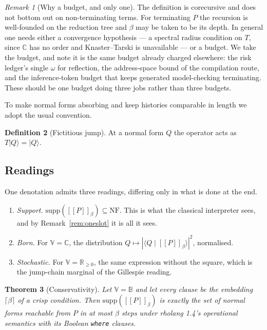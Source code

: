 \documentclass[11pt,a4paper]{article}
\theoremstyle{plain}
\newtheorem{theorem}{Theorem}[section]
\theoremstyle{definition}
\newtheorem{definition}[theorem]{Definition}
\theoremstyle{remark}
\newtheorem{remark}[theorem]{Remark}
\newcommand{\sem}[1]{[\![#1]\!]}
\newcommand{\V}{\mathbb{V}}
\newcommand{\Bool}{\mathbb{B}}
\newcommand{\Rnn}{\mathbb{R}_{\geq 0}}
\newcommand{\Cx}{\mathbb{C}}
\newcommand{\NF}{\mathrm{NF}}
\newcommand{\supp}{\mathrm{supp}}
\newcommand{\crisp}[1]{\lceil #1 \rceil}
\begin{document}
\begin{remark}[Why a budget, and only one]\label{rem:budget}
The definition is corecursive and does not bottom out on non-terminating terms.
For terminating $P$ the recursion is well-founded on the reduction tree and
$\beta$ may be taken to be its depth. In general one needs either a convergence
hypothesis --- a spectral radius condition on $T$, since $\Cx$ has no order and
Knaster--Tarski is unavailable --- or a budget. We take the budget, and note it
is the same budget already charged elsewhere: the risk ledger's single $\omega$
for reflection, the address-space bound of the compilation route, and the
inference-token budget that keeps generated model-checking terminating. These
should be one budget doing three jobs rather than three budgets.
\end{remark}

To make normal forms absorbing and keep histories comparable in length we adopt
the usual convention.

\begin{definition}[Fictitious jump]\label{def:fict}
At a normal form $Q$ the operator acts as $T\lvert Q\rangle = \lvert Q\rangle$.
\end{definition}

\subsection{Readings}\label{ssec:pathsum}

One denotation admits three readings, differing only in what is done at the end.

\begin{enumerate}[leftmargin=1.4em,itemsep=2pt]
\item \emph{Support.} $\supp(\sem{P}_\beta) \subseteq \NF$. This is what the
classical interpreter sees, and by Remark~\ref{rem:oneslot} it is all it sees.
\item \emph{Born.} For $\V = \Cx$, the distribution
$Q \mapsto |\langle Q \mid \sem{P}_\beta\rangle|^2$, normalised.
\item \emph{Stochastic.} For $\V = \Rnn$, the same expression without the
square, which is the jump-chain marginal of the Gillespie reading.
\end{enumerate}

\begin{theorem}[Conservativity]\label{thm:conservativity}
Let $\V = \Bool$ and let every clause be the embedding $\crisp{\beta}$ of a
crisp condition. Then $\supp(\sem{P}_\beta)$ is exactly the set of normal forms
reachable from $P$ in at most $\beta$ steps under rholang 1.4's operational
semantics with its Boolean \texttt{where} clauses.
\end{theorem}
\end{document}
